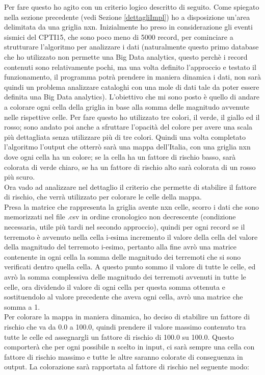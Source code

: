 Per fare questo ho agito con un criterio logico descritto di seguito. Come spiegato nella sezione precedente (vedi Sezione \ref{dettagliImpl}) ho a disposizione un'area delimitata da una griglia nxn. Inizialmente ho preso in considerazione gli eventi sismici del CPTI15, che sono poco meno di 5000 record, per cominciare a strutturare l'algoritmo per analizzare i dati (naturalmente questo primo database che ho utilizzato non permette una Big Data analytics, questo perch\`e i record contenuti sono relativamente pochi, ma una volta definito l'approccio e testato il funzionamento, il programma potr\`a prendere in maniera dinamica i dati, non sar\`a quindi un problema analizzare cataloghi con una mole di dati tale da poter essere definita una Big Data analytics). L'obiettivo che mi sono posto \`e quello di andare a colorare ogni cella della griglia in base alla somma delle magnitudo avvenute nelle rispettive celle. Per fare questo ho utilizzato tre colori, il verde, il giallo ed il rosso; sono andato poi anche a sfruttare l'opacit\`a del colore per avere una scala pi\`u dettagliata senza utilizzare pi\`u di tre colori. Quindi una volta completato l'algoritmo l'output che otterr\`o sar\`a una mappa dell'Italia, con una griglia nxn dove ogni cella ha un colore; se la cella ha un fattore di rischio basso, sar\`a colorata di verde chiaro, se ha un fattore di rischio alto sar\`a colorata di un rosso pi\`u scuro.\\
Ora vado ad analizzare nel dettaglio il criterio che permette di stabilire il fattore di rischio, che verr\`a utilizzato per colorare le celle della mappa.\\
Presa la matrice che rappresenta la griglia avente nxn celle, scorro i dati che sono memorizzati nel file .csv in ordine cronologico non decrescente (condizione necessaria, utile pi\`u tardi nel secondo approccio), quindi per ogni record se il terremoto \`e avvenuto nella cella i-esima incremento il valore della cella del valore della magnitudo del terremoto i-esimo, pertanto alla fine avr\`o una matrice contenente in ogni cella la somma delle magnitudo dei terremoti che si sono verificati dentro quella cella. A questo punto sommo il valore di tutte le celle, ed avr\`o la somma complessiva delle magnitudo dei terremoti avvenuti in tutte le celle, ora dividendo il valore di ogni cella per questa somma ottenuta e sostituendolo al valore precedente che aveva ogni cella, avr\`o una matrice che somma a 1.\\
Per colorare la mappa in maniera dinamica, ho deciso di stabilire un fattore di rischio che va da 0.0 a 100.0, quindi prendere il valore massimo contenuto tra tutte le celle ed assegnargli un fattore di rischio di 100.0 su 100.0. Questo comporter\`a che per ogni possibile n scelto in input, ci sar\`a sempre una cella con fattore di rischio massimo e tutte le altre saranno colorate di conseguenza in output. La colorazione sar\`a rapportata al fattore di rischio nel seguente modo:
